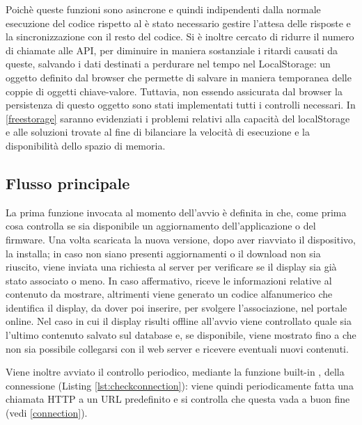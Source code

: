 Poichè queste funzioni sono asincrone e quindi indipendenti dalla normale esecuzione del codice rispetto al è stato necessario gestire l'attesa delle risposte e la sincronizzazione con il resto del codice. Si è inoltre cercato di ridurre il numero di chiamate alle API, per diminuire in maniera sostanziale i ritardi causati da queste, salvando i dati destinati a perdurare nel tempo nel LocalStorage: un oggetto definito dal browser che permette di salvare in maniera temporanea delle coppie di oggetti chiave-valore. Tuttavia, non essendo assicurata dal browser la persistenza di questo oggetto sono stati implementati tutti i controlli necessari. In \ref*{freestorage} saranno evidenziati i problemi relativi alla capacità del localStorage e alle soluzioni trovate al fine di bilanciare la velocità di esecuzione e la disponibilità dello spazio di memoria.

\subsection{Flusso principale}\label{flusso_principale}

La prima funzione invocata al momento dell'avvio è  definita in  che, come prima cosa controlla se sia disponibile un aggiornamento dell'applicazione o del firmware. Una volta scaricata la nuova versione, dopo aver riavviato il dispositivo, la installa; in caso non siano presenti aggiornamenti o il download non sia riuscito, viene inviata una richiesta al server per verificare se il display sia già stato associato o meno. In caso affermativo, riceve le informazioni relative al contenuto da mostrare, altrimenti viene generato un codice alfanumerico che identifica il display, da dover poi inserire, per svolgere l'associazione, nel portale online. Nel caso in cui il display risulti offline all'avvio viene controllato quale sia l'ultimo contenuto salvato sul database e, se disponibile, viene mostrato fino a che non sia possibile collegarsi con il web server e ricevere eventuali nuovi contenuti.

Viene inoltre avviato il controllo periodico, mediante la funzione built-in , della connessione (Listing \ref*{lst:checkconnection}): viene quindi periodicamente fatta una chiamata HTTP a un URL predefinito e si controlla che questa vada a buon fine (vedi \ref*{connection}).



